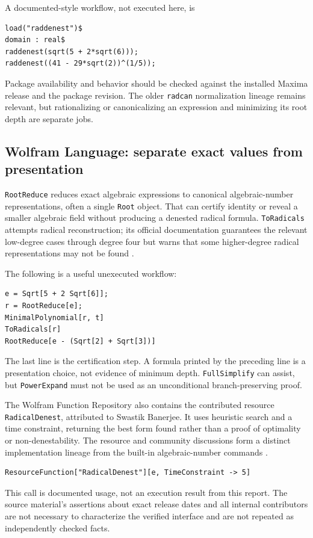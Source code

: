 \documentclass[11pt,letterpaper]{article}
\numberwithin{equation}{section}
\theoremstyle{definition}
\theoremstyle{remark}
\begin{document}
A documented-style workflow, not executed here, is
\begin{lstlisting}
load("raddenest")$
domain : real$
raddenest(sqrt(5 + 2*sqrt(6)));
raddenest((41 - 29*sqrt(2))^(1/5));
\end{lstlisting}
Package availability and behavior should be checked against the installed Maxima release and the package revision. The older \texttt{radcan} normalization lineage remains relevant, but rationalizing or canonicalizing an expression and minimizing its root depth are separate jobs.

\subsection{Wolfram Language: separate exact values from presentation}
\texttt{RootReduce} reduces exact algebraic expressions to canonical algebraic-number representations, often a single \texttt{Root} object. That can certify identity or reveal a smaller algebraic field without producing a denested radical formula. \texttt{ToRadicals} attempts radical reconstruction; its official documentation guarantees the relevant low-degree cases through degree four but warns that some higher-degree radical representations may not be found \cite{wolframroot,wolframradicals}.

The following is a useful unexecuted workflow:
\begin{lstlisting}
e = Sqrt[5 + 2 Sqrt[6]];
r = RootReduce[e];
MinimalPolynomial[r, t]
ToRadicals[r]
RootReduce[e - (Sqrt[2] + Sqrt[3])]
\end{lstlisting}
The last line is the certification step. A formula printed by the preceding line is a presentation choice, not evidence of minimum depth. \texttt{FullSimplify} can assist, but \texttt{PowerExpand} must not be used as an unconditional branch-preserving proof.

The Wolfram Function Repository also contains the contributed resource \texttt{RadicalDenest}, attributed to Swastik Banerjee. It uses heuristic search and a time constraint, returning the best form found rather than a proof of optimality or non-denestability. The resource and community discussions form a distinct implementation lineage from the built-in algebraic-number commands \cite{wolframresource,wolframcommunity}.
\begin{lstlisting}
ResourceFunction["RadicalDenest"][e, TimeConstraint -> 5]
\end{lstlisting}
This call is documented usage, not an execution result from this report. The source material's assertions about exact release dates and all internal contributors are not necessary to characterize the verified interface and are not repeated as independently checked facts.
\end{document}

